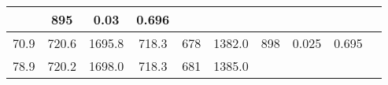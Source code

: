 \documentclass[a4paper,10pt]{article}
\begin{document}
\begin{longtable}{
     |
%    
    c|
%    
    c|
%    
    c|
%    
    c|
%    
    c|
%    
    c|
%    
    c|
%    
    c|
%    
    c|
%    
    c|
%    
    }
%        
        & 895
%        

%        

%        
        & 0.03
%        

%        

%        
        & 0.696
%        

%        
        \\
        \hline

        

%        

%        
        70.9
%        

%        

%        
        & 720.6
%        

%        

%        
        & 1695.8
%        

%        

%        
        & 718.3
%        

%        

%        
        & 678
%        

%        

%        
        & 1382.0
%        

%        

%        
        & 898
%        

%        

%        
        & 0.025
%        

%        

%        
        & 0.695
%        

%        
        \\
        \hline

        

%        

%        
        78.9
%        

%        

%        
        & 720.2
%        

%        

%        
        & 1698.0
%        

%        

%        
        & 718.3
%        

%        

%        
        & 681
%        

%        

%        
        & 1385.0
%        

%        


\end{longtable}
\end{document}
